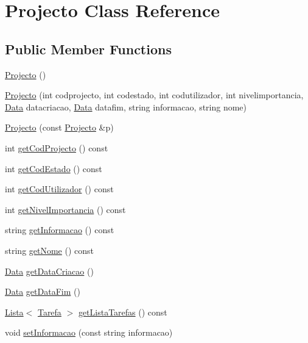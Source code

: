 \hypertarget{class_projecto}{\section{Projecto Class Reference}
\label{class_projecto}
}
\subsection*{Public Member Functions}
\begin{DoxyCompactItemize}
\item 
\hyperlink{class_projecto_acd3fb7ded07dde2a33c2f536747b84fd}{Projecto} ()
\item 
\hyperlink{class_projecto_a32713d07acc126313a94451ba6cf8f8a}{Projecto} (int codprojecto, int codestado, int codutilizador, int nivelimportancia, \hyperlink{class_data}{Data} datacriacao, \hyperlink{class_data}{Data} datafim, string informacao, string nome)
\item 
\hyperlink{class_projecto_ac5c791a42ac9a2698e6a60c9893e9e82}{Projecto} (const \hyperlink{class_projecto}{Projecto} \&p)
\item 
int \hyperlink{class_projecto_a2cebbbd7c3da1d91442ec123bd21fcc8}{get\-Cod\-Projecto} () const 
\item 
int \hyperlink{class_projecto_a257ceba804401bd5ba11656bd3eb5056}{get\-Cod\-Estado} () const 
\item 
int \hyperlink{class_projecto_a46639e3eef60632ad755e813341ade3d}{get\-Cod\-Utilizador} () const 
\item 
int \hyperlink{class_projecto_abc7ad8692546240e8af222bd799b025b}{get\-Nivel\-Importancia} () const 
\item 
string \hyperlink{class_projecto_aa2311080a1ac32e5b0a9f405a5e1ce00}{get\-Informacao} () const 
\item 
string \hyperlink{class_projecto_ab550054e131eaa02c6886de83c3758a9}{get\-Nome} () const 
\item 
\hyperlink{class_data}{Data} \hyperlink{class_projecto_a622fa8ce7efce0043731d9ddbd4eaf77}{get\-Data\-Criacao} ()
\item 
\hyperlink{class_data}{Data} \hyperlink{class_projecto_a12fa61b110c99d70b993da661e9c1fb1}{get\-Data\-Fim} ()
\item 
\hyperlink{class_lista}{Lista}$<$ \hyperlink{class_tarefa}{Tarefa} $>$ \hyperlink{class_projecto_a4da8f6681c4741db0c9d4e04eb793516}{get\-Lista\-Tarefas} () const 
\item 
void \hyperlink{class_projecto_a6f5d0bcd5047e203aaf3a1bdd38f26ec}{set\-Informacao} (const string informacao)

\end{DoxyCompactItemize}
